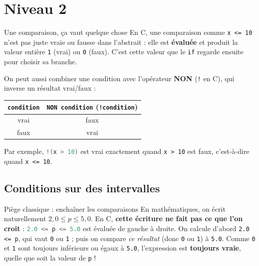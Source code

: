 \section{Niveau 2}

\begin{UPSTIinfor}{Une comparaison, ça vaut quelque chose}
    En C, une comparaison comme \texttt{x <= 10} n'est pas juste \og vraie \fg{} ou \og fausse \fg{} dans l'abstrait : elle est \textbf{évaluée} et produit la valeur entière \texttt{1} (vrai) ou \texttt{0} (faux). C'est cette valeur que le \texttt{if} regarde ensuite pour choisir sa branche.

    On peut aussi combiner une condition avec l'opérateur \textbf{NON} (\texttt{!} en C), qui inverse un résultat vrai/faux :
    \begin{center}
        \begin{tabular}{|c|c|}
            \hline
            \texttt{condition} & \texttt{NON condition} (\texttt{!condition}) \\
            \hline
            vrai                & faux                                          \\
            faux                & vrai                                          \\
            \hline
        \end{tabular}
    \end{center}
    Par exemple, \lstinline[language=C]{!(x > 10)} est vrai exactement quand \texttt{x > 10} est faux, c'est-à-dire quand \texttt{x <= 10}.
\end{UPSTIinfor}

\subsection{Conditions sur des intervalles}

\begin{UPSTIwarning}{Piège classique : enchaîner les comparaisons}
    En mathématiques, on écrit naturellement $2{,}0 \le p \le 5{,}0$. En C, \textbf{cette écriture ne fait pas ce que l'on croit} : \lstinline[language=C]{2.0 <= p <= 5.0} est évaluée de gauche à droite. On calcule d'abord \texttt{2.0 <= p}, qui vaut \texttt{0} ou \texttt{1} ; puis on compare \emph{ce résultat} (donc \texttt{0} ou \texttt{1}) à \texttt{5.0}. Comme \texttt{0} et \texttt{1} sont toujours inférieurs ou égaux à \texttt{5.0}, l'expression est \textbf{toujours vraie}, quelle que soit la valeur de \texttt{p} !
\end{UPSTIwarning}

